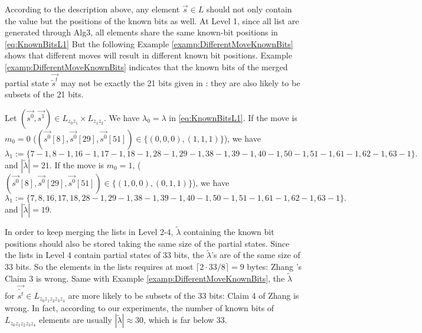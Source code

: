 According to the description above, any element $\vec{s}\in L$ should not only contain the value but the  positions of the known bits as well.
At Level 1, since all list are generated through Alg3, all elements share the same known-bit positions in \eqref{eq:KnownBitsL1}
But the following Example \ref{examp:DifferentMoveKnownBits} shows that different moves will result in different known bit positions.
Example \ref{examp:DifferentMoveKnownBits} indicates that the known bits of the merged partial state $\vec{\tilde{s}^t}$ may not be exactly the 21 bits given in \cite{AC:Zhang19}: they are also likely to be subsets of the 21 bits.
\begin{example}\label{examp:DifferentMoveKnownBits}
  Let $(\vec{s^0},\vec{s^1})\in L_{z_0z_1}\times L_{z_1z_2}$.
  We have $\lambda_0=\lambda$ in \eqref{eq:KnownBitsL1}.
  If the move is $m_0=0$ ($(\vec{s^0}[8], \vec{s^0}[29], \vec{s^0}[51])\in \{(0,0,0),(1,1,1)\}$), we have
  \[
  \lambda_1:=\{7-1,8-1,16-1,17-1,18-1,   28-1,29-1,38-1,39-1,40-1,  50-1,51-1,61-1,62-1,63-1  \}.
  \]
  and $|\tilde{\lambda}|=21$.
  If the move is $m_0=1$, ($(\vec{s^0}[8], \vec{s^0}[29], \vec{s^0}[51])\in \{(1,0,0),(0,1,1)\}$), we have
  \[
  \lambda_1:=\{7,8,16,17,18,   28-1,29-1,38-1,39-1,40-1,  50-1,51-1,61-1,62-1,63-1  \}.
  \]
    and $|\tilde{\lambda}|=19$.
\end{example}
In order to keep merging the lists in Level 2-4, $\tilde{\lambda}$ containing the known bit positions should also be stored taking the same size of the partial states.
Since the lists in Level 4 contain partial states of 33 bits, the $\tilde{\lambda}$'s are of the same size of 33 bits.
So the elements in the lists requires at most $\lceil 2\cdot 33/8\rceil=9$ bytes: Zhang \etal's Claim 3 is wrong.
Same with Example \ref{examp:DifferentMoveKnownBits}, the $\tilde{\lambda}$ for $\vec{\tilde{s^t}}\in L_{z_0z_1z_2z_3z_4}$ are more likely to be subsets of the 33 bits: Claim 4 of Zhang \etal is wrong.
In fact, according to our experiments, the number of known bits of $L_{z_0z_1z_2z_3z_4}$ elements are usually $|\tilde{\lambda}|\approx 30$, which is far below 33.

